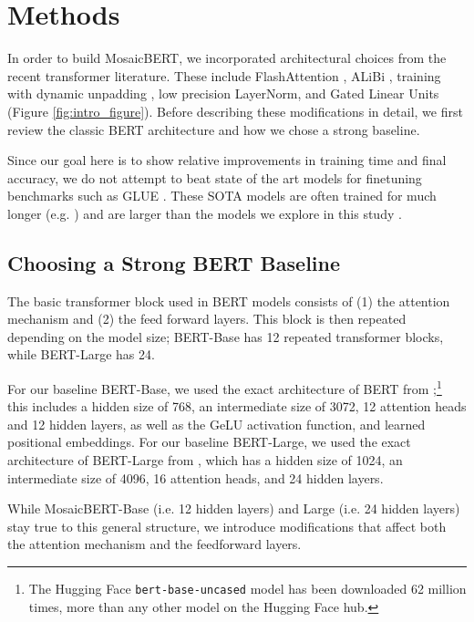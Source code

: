 \documentclass{article}
\begin{document}
\section{Methods}


In order to build MosaicBERT, we incorporated architectural choices from the recent transformer literature. These include FlashAttention \citep{dao2022flashattention}, ALiBi \citep{press2021train}, training with dynamic unpadding \citep{zeng2022boosting}, low precision LayerNorm, and Gated Linear Units \citep{dauphin2017language,shazeer2020glu} (Figure \ref{fig:intro_figure}). Before describing these modifications in detail, we first review the classic BERT architecture and how we chose a strong baseline.

Since our goal here is to show relative improvements in training time and final accuracy, we do not attempt to beat state of the art models for finetuning benchmarks such as GLUE \citep{wang2018glue}. These SOTA models are often trained for much longer (e.g. \citep{liu2019roberta}) and are larger than the models we explore in this study \citep{clark2020electra,he2021debertav3}.

\subsection{Choosing a Strong BERT Baseline}

The basic transformer block used in BERT models consists of (1) the attention mechanism and (2) the feed forward layers. This block is then repeated depending on the model size; BERT-Base has 12 repeated transformer blocks, while BERT-Large has 24. 

For our baseline BERT-Base, we used the exact architecture of BERT from \cite{devlin2018bert};\footnote{The Hugging Face \texttt{bert-base-uncased} model has been downloaded 62 million times, more than any other model on the Hugging Face hub.} this includes a hidden size of 768, an intermediate size of 3072, 12 attention heads and 12 hidden layers, as well as the GeLU activation function, and learned positional embeddings. For our baseline BERT-Large, we used  the exact architecture of BERT-Large from \cite{devlin2018bert}, which has a hidden size of 1024, an intermediate size of 4096, 16 attention heads, and 24 hidden layers.

While MosaicBERT-Base (i.e. 12 hidden layers) and Large (i.e. 24 hidden layers) stay true to this general structure, we introduce modifications that affect both the attention mechanism and the feedforward layers.
\end{document}
